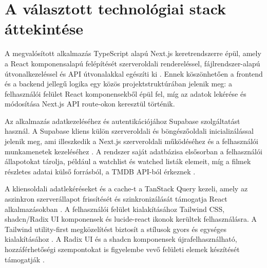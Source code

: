 \section{A választott technológiai stack áttekintése}

A megvalósított alkalmazás TypeScript alapú Next.js keretrendszerre épül, amely a React komponensalapú felépítését szerveroldali rendereléssel, fájlrendszer-alapú útvonalkezeléssel és API útvonalakkal egészíti ki \cite{nextjsAppRouter,reactDescribingUi}. Ennek köszönhetően a frontend és a backend jellegű logika egy közös projektstruktúrában jelenik meg: a felhasználói felület React komponensekből épül fel, míg az adatok lekérése és módosítása Next.js API route-okon keresztül történik.

Az alkalmazás adatkezeléséhez és autentikációjához Supabase szolgáltatást használ. A Supabase kliens külön szerveroldali és böngészőoldali inicializálással jelenik meg, ami illeszkedik a Next.js szerveroldali működéséhez és a felhasználói munkamenetek kezeléséhez \cite{supabaseNextjsServerSideAuth}. A rendszer saját adatbázisa elsősorban a felhasználói állapotokat tárolja, például a watchlist és watched listák elemeit, míg a filmek részletes adatai külső forrásból, a TMDB API-ból érkeznek \cite{tmdbApiGettingStarted}.

A kliensoldali adatlekéréseket és a cache-t a TanStack Query kezeli, amely az aszinkron szerverállapot frissítését és szinkronizálását támogatja React alkalmazásokban \cite{tanstackQueryOverview}. A felhasználói felület kialakításához Tailwind CSS, shadcn/Radix UI komponensek és lucide-react ikonok kerültek felhasználásra. A Tailwind utility-first megközelítést biztosít a stílusok gyors és egységes kialakításához \cite{tailwindUtilityClasses}. A Radix UI és a shadcn komponensek újrafelhasználható, hozzáférhetőségi szempontokat is figyelembe vevő felületi elemek készítését támogatják \cite{radixPrimitivesIntro,shadcnComponents}.
